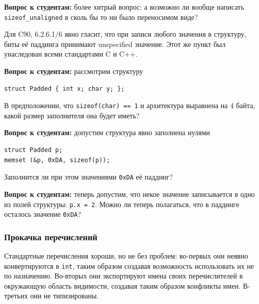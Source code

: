 \documentclass[a4paper,12pt,oneside]{article}
\newif\ifanswers
\begin{document}
\ifanswers
Правильный ответ: с учётом. Потому что иначе например не работала бы идиома \lstinline!malloc (sizeof(widget))! -- здесь выделялось бы динамической памяти меньше, чем реально нужно.
\fi

\textbf{Вопрос к студентам:} более хитрый вопрос: а возможно ли вообще написать \lstinline!sizeof_unaligned! в сколь бы то ни было переносимом виде?

\ifanswers
Правильный ответ автору неизвестен. Скорее всего нет, но никто не исключает наличие какого-нибудь особо хитрого трюка.
\fi

Для C90, 6.2.6.1/6 явно гласит, что при записи любого значения в структуру, биты её паддинга принимают unspecified значение. Этот же пункт был унаследован всеми стандартами C и C++.

\textbf{Вопрос к студентам:} рассмотрим структуру

\begin{lstlisting}
struct Padded { int x; char y; };
\end{lstlisting}

В предположении, что \lstinline!sizeof(char) == 1! и архитектура выравнена на 4 байта, какой размер заполнителя она будет иметь?

\ifanswers
Правильный ответ: 3 байта.
\fi

\textbf{Вопрос к студентам:} допустим структура явно заполнена нулями

\begin{lstlisting}
struct Padded p;
memset (&p, 0xDA, sizeof(p));
\end{lstlisting}

Заполнится ли при этом значениями \lstinline!0xDA! её паддинг?

\ifanswers
Верный ответ: да, несомненно.
\fi

\textbf{Вопрос к студентам:} теперь допустим, что некое значение записывается в одно из полей структуры: \lstinline!p.x = 2!. Можно ли теперь полагаться, что в паддинге осталось значение \lstinline!0xDA!?

\ifanswers
Верный ответ: нет, потому что см. выше, при записи в поля, паддинг unspecified.
\fi

\subsubsection{Прокачка перечислений}\label{EnumClass}

Стандартные перечисления хороши, но не без проблем: во-первых они неявно конвертируются в \lstinline!int!, таким образом создавая возможность использовать их не по назначению. Во-вторых они экспортируют имена своих перечислителей в окружающую область видимости, создавая таким образом конфликты имен. В-третьих они не типизированы.
\end{document}
